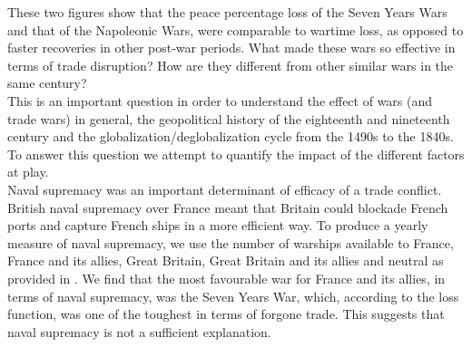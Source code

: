 \documentclass[12pt,a4paper,notitlepage]{article}
\begin{document}
These two figures show that the peace percentage loss of the Seven Years Wars and that of the Napoleonic Wars, were comparable to wartime loss, as opposed to faster recoveries in other post-war periods.
What made these wars so effective in terms of trade disruption?
How are they different from other similar wars in the same century? \\

This is an important question in order to understand the effect of wars (and trade wars) in general, the geopolitical history of the eighteenth and nineteenth century and the globalization/deglobalization cycle from the 1490s to the 1840s. \\
To answer this question we attempt to quantify the impact of the different factors at play. \\
Naval supremacy was an important determinant of efficacy of a trade conflict.
British naval supremacy over France meant that Britain could blockade French ports and capture French ships in a more efficient way.
To produce a yearly measure of naval supremacy, we use the number of warships available to France, France and its allies, Great Britain, Great Britain and its allies and neutral as provided in \cite{modelski1988seapower}.
We find that the most favourable war for France and its allies, in terms of naval supremacy, was the Seven Years War, which, according to the loss function, was one of the toughest in terms of forgone trade.
This suggests that naval supremacy is not a sufficient explanation. \\ 
\end{document}
